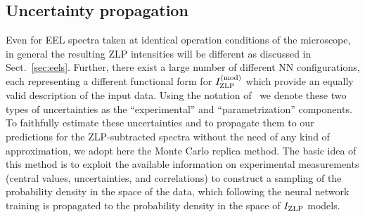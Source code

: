 %
%
%

\subsection{Uncertainty propagation}

Even for EEL spectra taken at identical operation conditions of the microscope,
in general the resulting ZLP intensities will be different as discussed
in Sect.~\ref{sec:eels}.
%
Further, there exist a large number of different NN configurations, each
representing a different functional form for $I_{\rm ZLP}^{(\rm mod)}$ which provide
an equally valid description of the input data.
%
Using the notation of~\cite{Ball:2014uwa} we denote these two types of uncertainties
as the ``experimental'' and ``parametrization'' components.
%
To faithfully estimate these uncertainties and to propagate them to our  predictions
for the ZLP-subtracted spectra without the need of any kind of approximation,
we adopt here the Monte Carlo replica method.
%
The basic idea of this method is to exploit the available information
on experimental measurements (central values, uncertainties, and correlations)
to construct a sampling of the probability density in the space of 
the data, which following the neural network training is propagated
to the probability density in the space of $I_{\rm ZLP}$ models.

%
%
%

